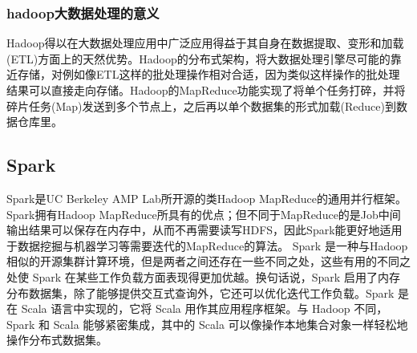     \subsubsection{hadoop大数据处理的意义}
    Hadoop得以在大数据处理应用中广泛应用得益于其自身在数据提取、变形和加载(ETL)方面上的天然优势。Hadoop的分布式架构，将大数据处理引擎尽可能的靠近存储，对例如像ETL这样的批处理操作相对合适，因为类似这样操作的批处理结果可以直接走向存储。Hadoop的MapReduce功能实现了将单个任务打碎，并将碎片任务(Map)发送到多个节点上，之后再以单个数据集的形式加载(Reduce)到数据仓库里。

  \subsection{Spark}
  Spark是UC Berkeley AMP Lab所开源的类Hadoop MapReduce的通用并行框架。Spark拥有Hadoop MapReduce所具有的优点；但不同于MapReduce的是Job中间输出结果可以保存在内存中，从而不再需要读写HDFS，因此Spark能更好地适用于数据挖掘与机器学习等需要迭代的MapReduce的算法。
  Spark 是一种与Hadoop 相似的开源集群计算环境，但是两者之间还存在一些不同之处，这些有用的不同之处使 Spark 在某些工作负载方面表现得更加优越。换句话说，Spark 启用了内存分布数据集，除了能够提供交互式查询外，它还可以优化迭代工作负载。Spark 是在 Scala 语言中实现的，它将 Scala 用作其应用程序框架。与 Hadoop 不同，Spark 和 Scala 能够紧密集成，其中的 Scala 可以像操作本地集合对象一样轻松地操作分布式数据集。

